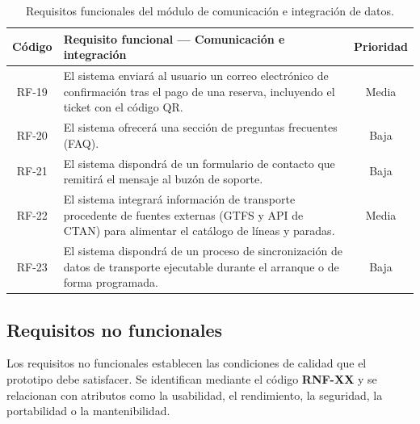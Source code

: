 \begin{table}[h!]
\centering
\small
\begin{tabular}{|c|p{10.5cm}|c|}
\hline
\textbf{Código} & \textbf{Requisito funcional --- Comunicación e integración} & \textbf{Prioridad} \\ \hline
RF-19 & El sistema enviará al usuario un correo electrónico de confirmación tras el pago de una reserva, incluyendo el ticket con el código QR. & Media \\ \hline
RF-20 & El sistema ofrecerá una sección de preguntas frecuentes (FAQ). & Baja \\ \hline
RF-21 & El sistema dispondrá de un formulario de contacto que remitirá el mensaje al buzón de soporte. & Baja \\ \hline
RF-22 & El sistema integrará información de transporte procedente de fuentes externas (GTFS y API de CTAN) para alimentar el catálogo de líneas y paradas. & Media \\ \hline
RF-23 & El sistema dispondrá de un proceso de sincronización de datos de transporte ejecutable durante el arranque o de forma programada. & Baja \\ \hline
\end{tabular}
\caption{Requisitos funcionales del módulo de comunicación e integración de datos.}
\label{tab:rf-comunicacion}
\end{table}


\subsection{Requisitos no funcionales}
\label{sec:requisitos-no-funcionales}

Los requisitos no funcionales establecen las condiciones de calidad que el prototipo debe satisfacer. Se identifican mediante el código \textbf{RNF-XX} y se relacionan con atributos como la usabilidad, el rendimiento, la seguridad, la portabilidad o la mantenibilidad.

